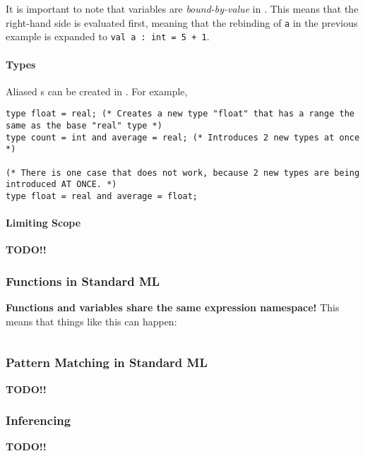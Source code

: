 It is important to note that variables are \emph{bound-by-value} in .
This means that the right-hand side is evaluated first, meaning that the rebinding of \texttt{a} in the previous example is expanded to \texttt{val a : int = 5 + 1}.

\paragraph{Types}\label{par:Functional-SML-Type_Declarations}
Aliased s can be created in .
For example,
\begin{verbatim}
type float = real; (* Creates a new type "float" that has a range the same as the base "real" type *)
type count = int and average = real; (* Introduces 2 new types at once *)

(* There is one case that does not work, because 2 new types are being introduced AT ONCE. *)
type float = real and average = float;
\end{verbatim}

\paragraph{Limiting Scope}\label{par:Functional-SML-Limit_Scope}
\textbf{TODO!!}

\subsubsection{Functions in Standard ML}\label{subsubsec:Functional-SML-Functions}
\textbf{Functions and variables share the same expression namespace!}
This means that things like this can happen:
\inputminted[frame=lines,linenos]{sml}{./EDAP05-Concepts_Programming_Languages-Sections/Functional_Programming/Code/Value_Shadowing.sml}

\subsubsection{Pattern Matching in Standard ML}\label{subsubsec:Functional-SML-Pattern_Matching}
\begin{definition}\label{def:Pattern_Matching}
  \textbf{TODO!!}
\end{definition}

\subsubsection{ Inferencing}\label{subsubsec:Functional-SML-Data_Type_Inferencing}
\begin{definition}\label{def:Functional-SML-Data_Type_Inferencing}
  \textbf{TODO!!}
\end{definition}

